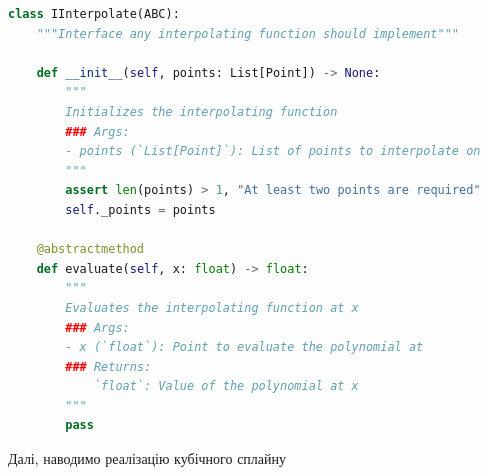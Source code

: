 \documentclass[12pt]{extarticle}
\begin{document}
\begin{lstlisting}[language=Python, caption=Інтерфейс для інтерполяційної функції]
class IInterpolate(ABC):
    """Interface any interpolating function should implement"""
    
    def __init__(self, points: List[Point]) -> None:
        """ 
        Initializes the interpolating function
        ### Args:
        - points (`List[Point]`): List of points to interpolate on
        """
        assert len(points) > 1, "At least two points are required"
        self._points = points
    
    @abstractmethod
    def evaluate(self, x: float) -> float:
        """
        Evaluates the interpolating function at x
        ### Args:
        - x (`float`): Point to evaluate the polynomial at
        ### Returns:
            `float`: Value of the polynomial at x
        """
        pass
\end{lstlisting}

Далі, наводимо реалізацію кубічного сплайну
\end{document}
